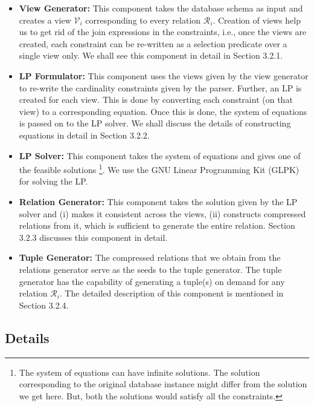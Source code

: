 \documentclass[]{article}
\begin{document}
\begin{multicols}{2}
\begin{itemize}
			\item {\bf View Generator:} 
			This component takes the database schema as input and creates a view $\mathcal{V}_{i}$ corresponding to every relation $\mathcal{R}_{i}$. 
			Creation of views help us to get rid of the join expressions in the constraints, i.e., once the views are created, each constraint can be re-written as a selection predicate over a single view only. 
			We shall see this component in detail in Section 3.2.1.
		
			\item {\bf LP Formulator:} 
			This component uses the views given by the view generator to re-write the cardinality constraints given by the parser. 
			Further, an LP is created for each view. This is done by converting each constraint (on that view) to a corresponding equation. 
			Once this is done, the system of equations is passed on to the LP solver. 
			We shall discuss the details of constructing equations in detail in Section 3.2.2.
		
			\item {\bf LP Solver:} 
			This component takes the system of equations and gives one of the feasible solutions
			\footnote{The system of equations can have infinite solutions. 
			The solution corresponding to the original database instance might differ from the solution we get here. But, both the solutions would satisfy all the constraints.}. 
			We use the GNU Linear Programming Kit (GLPK) \cite{glpk} for solving the LP. 
		
			\item {\bf Relation Generator:} 
			This component takes the solution given by the LP solver and 
				(i) makes it consistent across the views, 
				(ii) constructs compressed relations from it, which is sufficient to generate the entire relation. 
			Section 3.2.3 discusses this component in detail.
		
			\item {\bf Tuple Generator:} 
			The compressed relations that we obtain from the relations generator serve as the seeds to the tuple generator. 
			The tuple generator has the capability of generating a tuple(s) on demand for any relation $\mathcal{R}_{i}$. 
			The detailed description of this component is mentioned in Section 3.2.4.
		
		\end{itemize}
	
		\subsection{Details}

\end{multicols}
\end{document}

